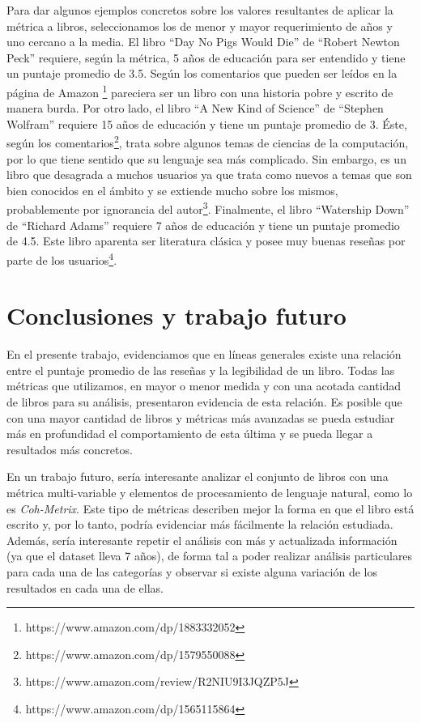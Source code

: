 \documentclass[12pt,journal,compsoc]{IEEEtran}
\begin{document}
Para dar algunos ejemplos concretos sobre los valores resultantes de aplicar la métrica a libros, seleccionamos los de menor y mayor requerimiento de años y uno cercano a la media. El libro ``Day No Pigs Would Die'' de ``Robert Newton Peck'' requiere, según la métrica, 5 años de educación para ser entendido y tiene un puntaje promedio de 3.5. Según los comentarios que pueden ser leídos en la página de Amazon \footnote{https://www.amazon.com/dp/1883332052} pareciera ser un libro con una historia pobre y escrito de manera burda. Por otro lado, el libro ``A New Kind of Science'' de ``Stephen Wolfram'' requiere 15 años de educación y tiene un puntaje promedio de 3. Éste, según los comentarios\footnote{https://www.amazon.com/dp/1579550088}, trata sobre algunos temas de ciencias de la computación, por lo que tiene sentido que su lenguaje sea más complicado. Sin embargo, es un libro que desagrada a muchos usuarios ya que trata como nuevos a temas que son bien conocidos en el ámbito y se extiende mucho sobre los mismos, probablemente por ignorancia del autor\footnote{https://www.amazon.com/review/R2NIU9I3JQZP5J}. Finalmente, el libro ``Watership Down'' de ``Richard Adams'' requiere 7 años de educación y tiene un puntaje promedio de 4.5. Este libro aparenta ser literatura clásica y posee muy buenas reseñas por parte de los usuarios\footnote{https://www.amazon.com/dp/1565115864}.


\section{Conclusiones y trabajo futuro} 

En el presente trabajo, evidenciamos que en líneas generales existe una relación entre el puntaje promedio de las reseñas y la legibilidad de un libro. Todas las métricas que utilizamos, en mayor o menor medida y con una acotada cantidad de libros para su análisis, presentaron evidencia de esta relación. Es posible que con una mayor cantidad de libros y métricas más avanzadas se pueda estudiar más en profundidad el comportamiento de esta última y se pueda llegar a resultados más concretos.

En un trabajo futuro, sería interesante analizar el conjunto de libros con una métrica multi-variable y elementos de procesamiento de lenguaje natural, como lo es \textit{Coh-Metrix}\cite{graesser}. Este tipo de métricas describen mejor la forma en que el libro está escrito y, por lo tanto, podría evidenciar más fácilmente la relación estudiada. Además, sería interesante repetir el análisis con más y actualizada información (ya que el dataset lleva 7 años), de forma tal a poder realizar análisis particulares para cada una de las categorías y observar si existe alguna variación de los resultados en cada una de ellas.
\end{document}
